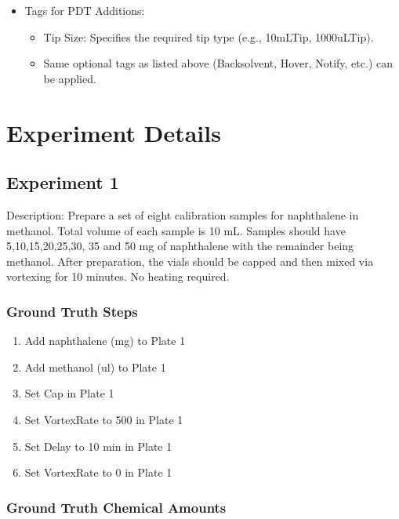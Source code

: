 \documentclass[sn-nature, twocolumn]{sn-jnl}%
\theoremstyle{thmstyleone}%
\theoremstyle{thmstyletwo}%
\theoremstyle{thmstylethree}%
\begin{document}
\begin{enumerate}
\begin{itemize}
        \item Tags for PDT Additions:
        \begin{itemize}
            \item Tip Size: Specifies the required tip type (e.g., 10mLTip, 1000uLTip).
            \item Same optional tags as listed above (Backsolvent, Hover, Notify, etc.) can be applied.
        \end{itemize}

    \end{itemize}

\end{enumerate}

\clearpage
\section{Experiment Details}
\subsection{Experiment 1}

Description: Prepare a set of eight calibration samples for naphthalene in methanol. Total volume of each sample is 10 mL. Samples should have 5,10,15,20,25,30, 35 and 50 mg of naphthalene with the remainder being methanol. After preparation, the vials should be capped and then mixed via vortexing for 10 minutes. No heating required.


\subsubsection*{Ground Truth Steps}
\begin{enumerate}[itemsep=0pt]
    \item Add naphthalene (mg) to Plate 1
    \item Add methanol (ul) to Plate 1
    \item Set Cap in Plate 1
    \item Set VortexRate to 500 in Plate 1
    \item Set Delay to 10 min in Plate 1
    \item Set VortexRate to 0 in Plate 1
\end{enumerate}

\subsubsection*{Ground Truth Chemical Amounts}
\end{document}
